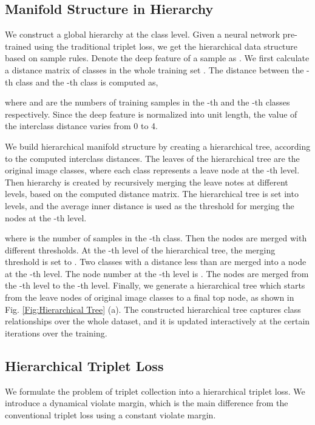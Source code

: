 \documentclass[runningheads]{llncs}
\begin{document}
\subsection{Manifold Structure in Hierarchy}
We construct a global hierarchy at the class level. Given a neural network  pre-trained using the traditional triplet loss, we get the hierarchical data structure based on sample rules. Denote the deep feature of a sample  as . We first calculate a distance matrix of  classes in the whole training set . The distance between the -th class and the -th class is computed as,

    
where  and  are the numbers of training samples in the -th and the -th classes respectively. Since the deep feature  is normalized into unit length, the value of the interclass distance  varies from 0 to 4.

We build hierarchical manifold structure by creating a hierarchical tree, according to the computed interclass distances. The leaves of the hierarchical tree are the original image classes, where each class represents a leave node at the -th level. Then hierarchy is created by recursively merging the leave notes at different levels, based on the computed distance matrix. The hierarchical tree is set into  levels, and the average inner distance  is used as the threshold for merging the nodes at the -th level.

    
where  is the number of samples in the -th class. Then the nodes are merged with different thresholds. At the -th level of the hierarchical tree, the merging threshold is set to . Two classes with a distance less than  are merged into a node at the -th level. The node number at the -th level is . The nodes are merged from the -th level to the -th level. Finally, we generate a hierarchical tree  which starts from the leave nodes of original image classes to a final top node, as shown in Fig. \ref{Fig:Hierarchical Tree} (a). The constructed hierarchical tree captures class relationships over the whole dataset, and it is updated interactively at the certain iterations over the training.

\subsection{Hierarchical Triplet Loss}
We formulate the problem of triplet collection into a hierarchical triplet loss. We introduce a dynamical violate margin, which is the main difference from the conventional triplet loss using a constant violate margin. \\
\end{document}
